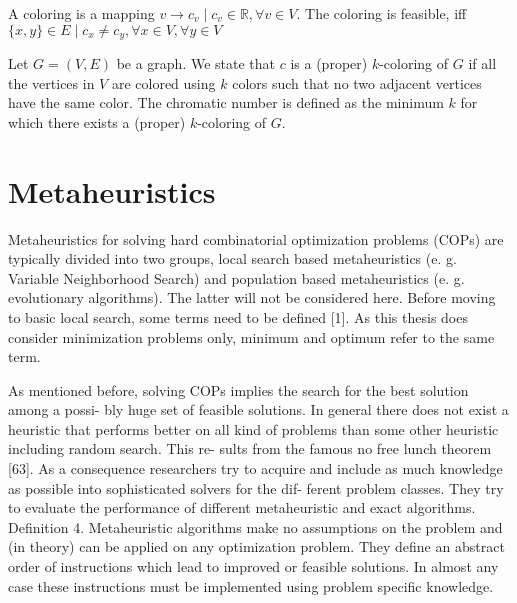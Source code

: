 \begin{definition}[Coloring]
A coloring is a mapping $v \rightarrow c_v \mid c_v \in \mathbb{R}, \forall v\in V$. The coloring is feasible, iff $\{x,y\}\in E \mid c_x \neq c_y, \forall x\in V, \forall y\in V$
\end{definition}

\begin{definition}
Let $G = (V, E)$ be a graph. We state that $c$ is a (proper) $k$-coloring of $G$ if all the vertices in $V$ are colored using $k$ colors such that no two adjacent vertices have the same color. The chromatic number is defined as the minimum $k$ for which there exists a (proper) $k$-coloring of $G$.
\end{definition}

\section{Metaheuristics}

Metaheuristics for solving hard combinatorial optimization problems (COPs) are typically divided into two groups, local search based metaheuristics (e. g. Variable Neighborhood Search) and population based metaheuristics (e. g. evolutionary algorithms). The latter will not be considered here. Before moving to basic local search, some terms need to be defined [1]. As this thesis does consider minimization problems only, minimum and optimum refer to the same term.

As mentioned before, solving COPs implies the search for the best solution among a possi-
bly huge set of feasible solutions. In general there does not exist a heuristic that performs
better on all kind of problems than some other heuristic including random search. This re-
sults from the famous no free lunch theorem [63]. As a consequence researchers try to
acquire and include as much knowledge as possible into sophisticated solvers for the dif-
ferent problem classes. They try to evaluate the performance of different metaheuristic and
exact algorithms.
Definition 4. Metaheuristic algorithms make no assumptions on the problem and (in theory)
can be applied on any optimization problem. They define an abstract order of instructions
which lead to improved or feasible solutions. In almost any case these instructions must be
implemented using problem specific knowledge.